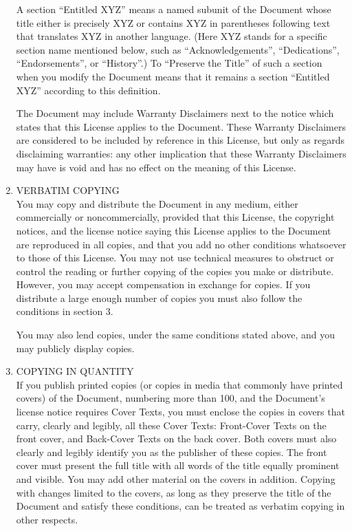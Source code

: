 \begin{enumerate}
  A section ``Entitled XYZ'' means a named subunit of the Document whose title either is
  precisely XYZ or contains XYZ in parentheses following text that translates XYZ in another
  language.  (Here XYZ stands for a specific section name mentioned below, such as
  ``Acknowledgements'', ``Dedications'', ``Endorsements'', or ``History''.)  To ``Preserve the
  Title'' of such a section when you modify the Document means that it remains a section
  ``Entitled XYZ'' according to this definition.

  The Document may include Warranty Disclaimers next to the notice which states that this
  License applies to the Document.  These Warranty Disclaimers are considered to be included by
  reference in this License, but only as regards disclaiming warranties: any other implication
  that these Warranty Disclaimers may have is void and has no effect on the meaning of this
  License.

\item
  VERBATIM COPYING \\
  You may copy and distribute the Document in any medium, either commercially or
  noncommercially, provided that this License, the copyright notices, and the license notice
  saying this License applies to the Document are reproduced in all copies, and that you add no
  other conditions whatsoever to those of this License.  You may not use technical measures to
  obstruct or control the reading or further copying of the copies you make or distribute.
  However, you may accept compensation in exchange for copies.  If you distribute a large enough
  number of copies you must also follow the conditions in section 3.

  You may also lend copies, under the same conditions stated above, and you may publicly display
  copies.

\item
  COPYING IN QUANTITY \\
  If you publish printed copies (or copies in media that commonly have printed covers) of the
  Document, numbering more than 100, and the Document's license notice requires Cover Texts, you
  must enclose the copies in covers that carry, clearly and legibly, all these Cover Texts:
  Front-Cover Texts on the front cover, and Back-Cover Texts on the back cover.  Both covers
  must also clearly and legibly identify you as the publisher of these copies.  The front cover
  must present the full title with all words of the title equally prominent and visible.  You
  may add other material on the covers in addition.  Copying with changes limited to the covers,
  as long as they preserve the title of the Document and satisfy these conditions, can be
  treated as verbatim copying in other respects.


\end{enumerate}
